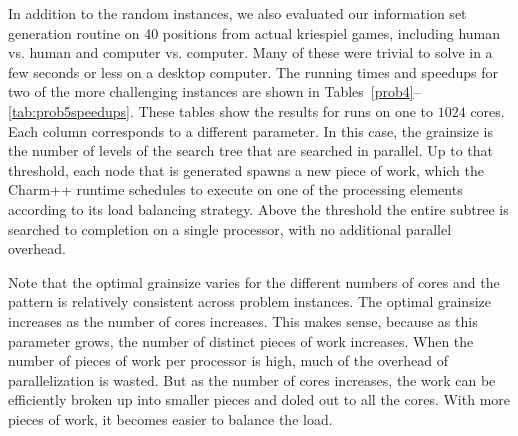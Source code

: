 \documentclass[times, 10pt,twocolumn]{article}
\begin{document}
In addition to the random instances, we also evaluated our information set generation routine on 40 positions from actual kriespiel games, including human vs. human and computer vs. computer.  Many of these were trivial to solve in a few seconds or less on a desktop computer.  The running times and speedups for two of the more challenging instances are shown in Tables~\ref{prob4}--\ref{tab:prob5speedups}.  These tables show the results for runs on one to $1024$ cores.  Each column corresponds to a different parameter.  In this case, the grainsize is the number of levels of the search tree that are searched in parallel.  Up to that threshold, each node that is generated spawns a new piece of work, which the {\sc Charm++} runtime schedules to execute on one of the processing elements according to its load balancing strategy.  Above the threshold the entire subtree is searched to completion on a single processor, with no additional parallel overhead. 

Note that the optimal grainsize varies for the different numbers of cores and the pattern is relatively consistent across problem instances.  The optimal grainsize increases as the number of cores increases.  This makes sense, because as this parameter grows, the number of distinct pieces of work increases.  When the number of pieces of work per processor is high, much of the overhead of parallelization is wasted.  But as the number of cores increases, the work can be efficiently broken up into smaller pieces and doled out to all the cores.  With more pieces of work, it becomes easier to balance the load.
\end{document}
